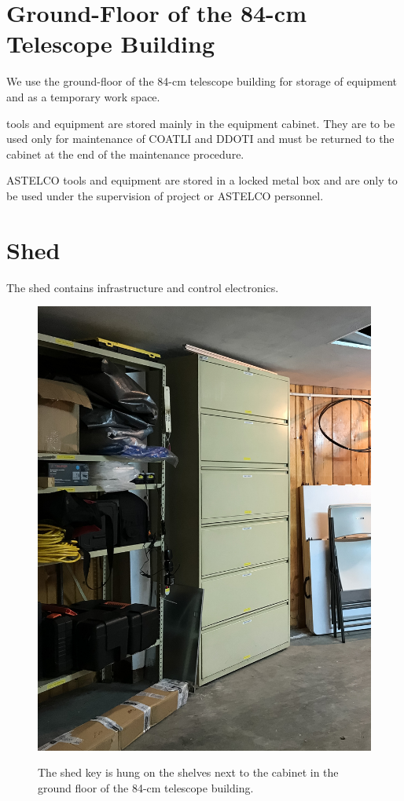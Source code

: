 \fi

\section{Ground-Floor of the 84-cm Telescope Building}

We use the ground-floor of the 84-cm telescope building for storage of equipment and as a temporary work space.

{\projectname} tools and equipment are stored mainly in the equipment cabinet. They are to be used only for maintenance of COATLI and DDOTI and must be returned to the cabinet at the end of the maintenance procedure.

ASTELCO tools and equipment are stored in a locked metal box and are only to be used under the supervision of project or ASTELCO personnel.

\section{Shed}
\label{section:shed}
\label{section:shed-key}

The shed contains infrastructure and control electronics.

\begin{figure}
\begin{center}
\begin{labeled}{\includegraphics[width=0.8\linewidth]{figures/buildings-shed-key.jpg}}
\end{labeled}
\end{center}
\caption{The shed key is hung on the shelves next to the cabinet in the ground floor of the 84-cm telescope building.}
\label{figure:buildings-shed-key}
\end{figure}

